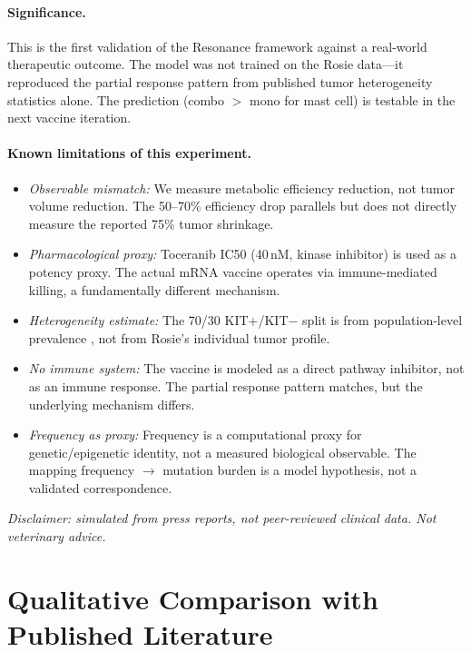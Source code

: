 \documentclass[11pt,a4paper]{article}
\begin{document}
\paragraph{Significance.}
This is the first validation of the Resonance framework against
a real-world therapeutic outcome. The model was not trained on
the Rosie data---it reproduced the partial response pattern from
published tumor heterogeneity statistics alone.
The prediction (combo $>$ mono for mast cell) is testable in
the next vaccine iteration.

\paragraph{Known limitations of this experiment.}
\begin{itemize}
  \item \emph{Observable mismatch:} We measure metabolic efficiency
        reduction, not tumor volume reduction. The 50--70\% efficiency
        drop parallels but does not directly measure the reported
        75\% tumor shrinkage.
  \item \emph{Pharmacological proxy:} Toceranib IC50 (40\,nM, kinase
        inhibitor) is used as a potency proxy. The actual mRNA vaccine
        operates via immune-mediated killing, a fundamentally different
        mechanism.
  \item \emph{Heterogeneity estimate:} The 70/30 KIT+/KIT$-$ split
        is from population-level prevalence
        \citep{london2003mast}, not from Rosie's individual
        tumor profile.
  \item \emph{No immune system:} The vaccine is modeled as a direct
        pathway inhibitor, not as an immune response. The partial
        response pattern matches, but the underlying mechanism differs.
  \item \emph{Frequency as proxy:} Frequency is a computational proxy
        for genetic/epigenetic identity, not a measured biological
        observable. The mapping frequency $\to$ mutation burden is a
        model hypothesis, not a validated correspondence.
\end{itemize}

\emph{Disclaimer: simulated from press reports, not peer-reviewed
clinical data. Not veterinary advice.}

\section{Qualitative Comparison with Published Literature}
\label{sec:paper-comparison}
\end{document}
